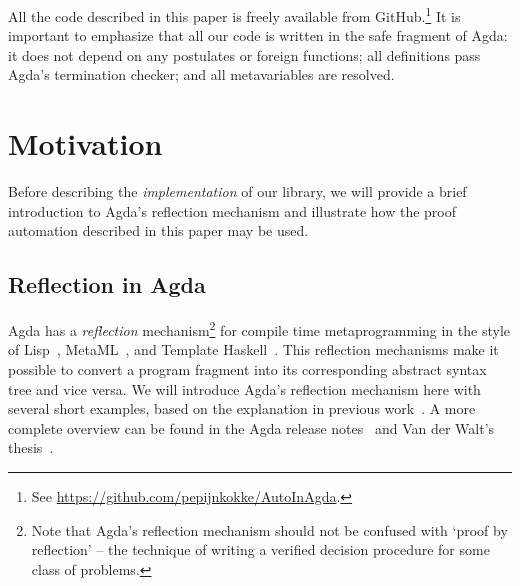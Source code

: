 \documentclass[preprint]{sigplanconf}
\begin{document}
All the code described in this paper is freely available from
GitHub.\footnote{
  See \url{https://github.com/pepijnkokke/AutoInAgda}.
} It is important to emphasize that all our code
is written in the safe fragment of Agda: it does not depend on any
postulates or foreign functions; all definitions pass Agda's
termination checker; and all metavariables are resolved.

\section{Motivation}
\label{sec:motivation}

Before describing the \emph{implementation} of our library, we will
provide a brief introduction to Agda's reflection mechanism and
illustrate how the proof automation described in this paper may be
used.

\subsection*{Reflection in Agda}

Agda has a \emph{reflection} mechanism\footnote{Note that Agda's
  reflection mechanism should not be confused with `proof by
  reflection' -- the technique of writing a verified decision
  procedure for some class of problems.} for compile time
metaprogramming in the style of Lisp~\cite{lisp-macros},
MetaML~\cite{metaml}, and Template
Haskell~\cite{template-haskell}. This reflection mechanisms make it
possible to convert a program fragment into its corresponding abstract
syntax tree and vice versa. We will introduce Agda's reflection
mechanism here with several short examples, based on the explanation
in previous work~\cite{van-der-walt}. A more complete overview can be
found in the Agda release notes~\cite{agda-relnotes-228} and Van der
Walt's thesis~\cite{vdWalt:Thesis:2012}.
\end{document}
